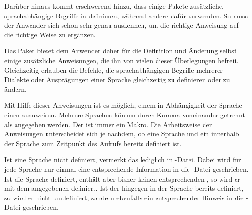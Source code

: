 Darüber hinaus kommt erschwerend hinzu, dass einige Pakete zusätzliche,
sprachabhängige Begriffe in  definieren,
während andere dafür  verwenden. So muss der
Anwender sich schon sehr genau auskennen, um die richtige Anweisung auf die
richtige Weise zu ergänzen.

Das Paket  bietet dem Anwender daher für die Definition und
Änderung selbst einige zusätzliche Anweisungen, die ihn von vielen dieser
Überlegungen befreit. Gleichzeitig erlauben die Befehle, die
sprachabhängigen Begriffe mehrerer Dialekte oder Ausprägungen einer Sprache
gleichzeitig zu definieren oder zu ändern.

\begin{Declaration}
\end{Declaration}
Mit Hilfe dieser Anweisungen ist es möglich, einem  in
Abhängigkeit der Sprache einen  zuzuweisen. Mehrere Sprachen
können durch Komma voneinander getrennt als
 angegeben werden.
Der  ist immer ein Makro. Die Arbeitsweise der Anweisungen
unterscheidet sich je nachdem, ob eine Sprache und ein 
innerhalb der Sprache zum Zeitpunkt des Aufrufs bereits definiert ist.

Ist eine Sprache nicht definiert, vermerkt  das
lediglich in -Datei. Dabei wird für jede Sprache nur einmal eine
entsprechende Information in die -Datei geschrieben. Ist die Sprache
definiert, enthält aber bisher keinen entsprechenden , so wird
er mit dem angegebenen  definiert. Ist der 
hingegen in der Sprache bereits definiert, so wird er nicht umdefiniert,
sondern ebenfalls ein entsprechender Hinweis in die -Datei
geschrieben.

